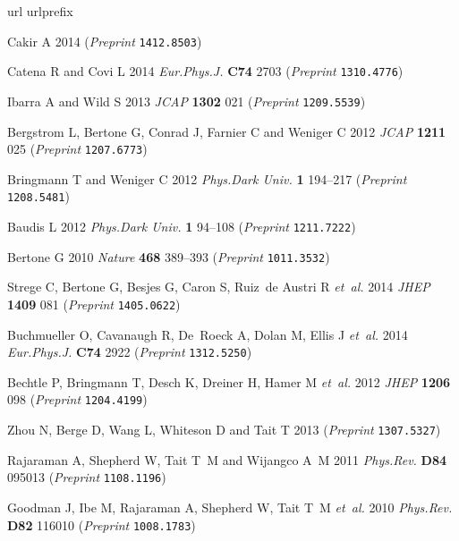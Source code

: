 \documentclass[11pt,a4paper]{article}
\begin{document}
\providecommand{\newblock}{}
\begin{thebibliography}{10}
\expandafter\ifx\csname url\endcsname\relax
  \def\url#1{{\tt #1}}\fi
\expandafter\ifx\csname urlprefix\endcsname\relax\def\urlprefix{URL }\fi
\providecommand{\eprint}[2][]{\url{#2}}

Cakir A 2014  (\textit{Preprint} \eprint{1412.8503})

Catena R and Covi L 2014 {\em Eur.Phys.J.\/} {\bf C74} 2703 (\textit{Preprint}
  \eprint{1310.4776})

Ibarra A and Wild S 2013 {\em JCAP\/} {\bf 1302} 021 (\textit{Preprint}
  \eprint{1209.5539})

Bergstrom L, Bertone G, Conrad J, Farnier C and Weniger C 2012 {\em JCAP\/}
  {\bf 1211} 025 (\textit{Preprint} \eprint{1207.6773})

Bringmann T and Weniger C 2012 {\em Phys.Dark Univ.\/} {\bf 1} 194--217
  (\textit{Preprint} \eprint{1208.5481})

Baudis L 2012 {\em Phys.Dark Univ.\/} {\bf 1} 94--108 (\textit{Preprint}
  \eprint{1211.7222})

Bertone G 2010 {\em Nature\/} {\bf 468} 389--393 (\textit{Preprint}
  \eprint{1011.3532})

Strege C, Bertone G, Besjes G, Caron S, Ruiz~de Austri R {\em et~al.\/} 2014
  {\em JHEP\/} {\bf 1409} 081 (\textit{Preprint} \eprint{1405.0622})

Buchmueller O, Cavanaugh R, De~Roeck A, Dolan M, Ellis J {\em et~al.\/} 2014
  {\em Eur.Phys.J.\/} {\bf C74} 2922 (\textit{Preprint} \eprint{1312.5250})

Bechtle P, Bringmann T, Desch K, Dreiner H, Hamer M {\em et~al.\/} 2012 {\em
  JHEP\/} {\bf 1206} 098 (\textit{Preprint} \eprint{1204.4199})

Zhou N, Berge D, Wang L, Whiteson D and Tait T 2013  (\textit{Preprint}
  \eprint{1307.5327})

Rajaraman A, Shepherd W, Tait T~M and Wijangco A~M 2011 {\em Phys.Rev.\/} {\bf
  D84} 095013 (\textit{Preprint} \eprint{1108.1196})

Goodman J, Ibe M, Rajaraman A, Shepherd W, Tait T~M {\em et~al.\/} 2010 {\em
  Phys.Rev.\/} {\bf D82} 116010 (\textit{Preprint} \eprint{1008.1783})


\end{thebibliography}
\end{document}
